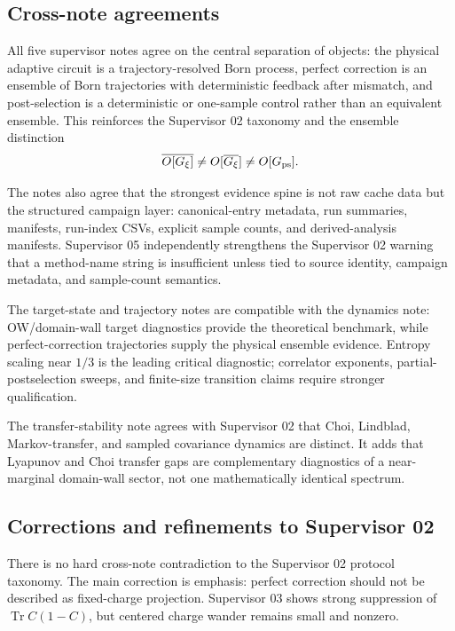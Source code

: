 \documentclass[aps,prb,onecolumn,nofootinbib,superscriptaddress]{revtex4-2}
\begin{document}
\subsection{Cross-note agreements}

All five supervisor notes agree on the central separation of objects: the
physical adaptive circuit is a trajectory-resolved Born process, perfect
correction is an ensemble of Born trajectories with deterministic feedback after
mismatch, and post-selection is a deterministic or one-sample control rather
than an equivalent ensemble.  This reinforces the Supervisor 02 taxonomy and the
ensemble distinction
\[
\overline{O[G_\xi]} \neq O[\overline{G_\xi}] \neq O[G_{\rm ps}] .
\]

The notes also agree that the strongest evidence spine is not raw cache data but
the structured campaign layer: canonical-entry metadata, run summaries,
manifests, run-index CSVs, explicit sample counts, and derived-analysis
manifests.  Supervisor 05 independently strengthens the Supervisor 02 warning
that a method-name string is insufficient unless tied to source identity,
campaign metadata, and sample-count semantics.

The target-state and trajectory notes are compatible with the dynamics note:
OW/domain-wall target diagnostics provide the theoretical benchmark, while
perfect-correction trajectories supply the physical ensemble evidence.  Entropy
scaling near \(1/3\) is the leading critical diagnostic; correlator exponents,
partial-postselection sweeps, and finite-size transition claims require stronger
qualification.

The transfer-stability note agrees with Supervisor 02 that Choi, Lindblad,
Markov-transfer, and sampled covariance dynamics are distinct.  It adds that
Lyapunov and Choi transfer gaps are complementary diagnostics of a near-marginal
domain-wall sector, not one mathematically identical spectrum.

\subsection{Corrections and refinements to Supervisor 02}

There is no hard cross-note contradiction to the Supervisor 02 protocol
taxonomy.  The main correction is emphasis: perfect correction should not be
described as fixed-charge projection.  Supervisor 03 shows strong suppression of
\(\operatorname{Tr} C(1-C)\), but centered charge wander remains small and
nonzero.
\end{document}
